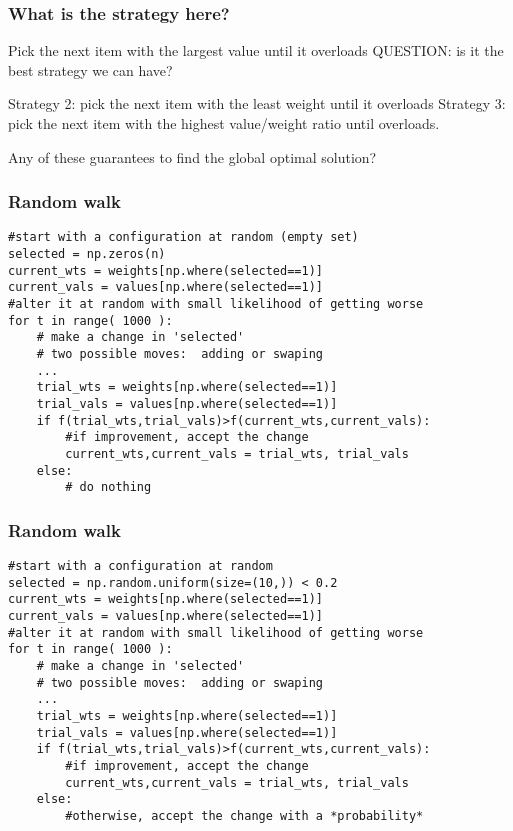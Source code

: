 \documentclass[11pt]{beamer}
\begin{document}
\begin{frame}[fragile]
  \frametitle{What is the strategy here?}
  \Enlarge

  \begin{enumerate}
  \myitem Pick the next item with the largest value until it overloads \pause
  \myitem QUESTION: is it the best strategy we can have? \pause
  \begin{enumerate}
  	\mysubitem Strategy 2: pick the next item with the least weight until it overloads \pause
	\mysubitem Strategy 3: pick the next item with the highest value/weight ratio until overloads. \pause
  \end{enumerate}
  \myitem Any of these guarantees to find the global optimal solution?
  \end{enumerate}
\end{frame}

\begin{frame}[fragile]
  \frametitle{Random walk}

  \begin{Verbatim}
#start with a configuration at random (empty set)
selected = np.zeros(n)
current_wts = weights[np.where(selected==1)]
current_vals = values[np.where(selected==1)]
#alter it at random with small likelihood of getting worse
for t in range( 1000 ):
    # make a change in 'selected'
    # two possible moves:  adding or swaping
    ...
    trial_wts = weights[np.where(selected==1)]
    trial_vals = values[np.where(selected==1)]
    if f(trial_wts,trial_vals)>f(current_wts,current_vals):
        #if improvement, accept the change
        current_wts,current_vals = trial_wts, trial_vals
    else:
        # do nothing
  \end{Verbatim}
\end{frame}

\begin{frame}[fragile]
  \frametitle{Random walk}

  \begin{Verbatim}
#start with a configuration at random
selected = np.random.uniform(size=(10,)) < 0.2
current_wts = weights[np.where(selected==1)]
current_vals = values[np.where(selected==1)]
#alter it at random with small likelihood of getting worse
for t in range( 1000 ):
    # make a change in 'selected'
    # two possible moves:  adding or swaping
    ...
    trial_wts = weights[np.where(selected==1)]
    trial_vals = values[np.where(selected==1)]
    if f(trial_wts,trial_vals)>f(current_wts,current_vals):
        #if improvement, accept the change
        current_wts,current_vals = trial_wts, trial_vals
    else:
        #otherwise, accept the change with a *probability*
  \end{Verbatim}
\end{frame}
\end{document}
